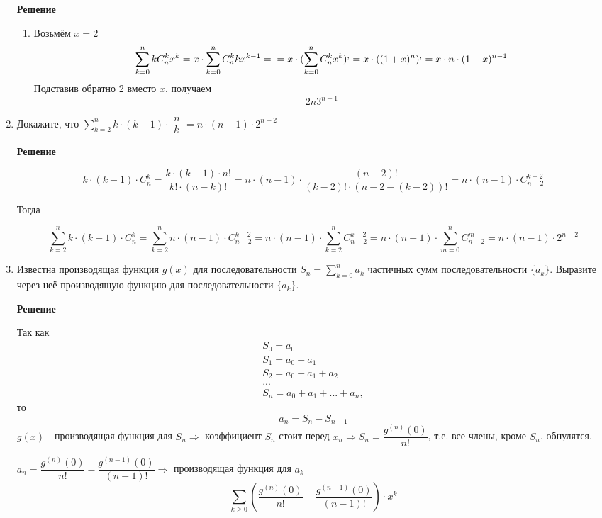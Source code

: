 \documentclass[12pt]{article}
\begin{document}
\begin{enumerate}[label={\textbf{\arabic{section}.\arabic*}}]
		\textbf{Решение}
		
		\begin{enumerate}[label=\textbf{\alph*)}]
			\item Возьмём $x = 2$
			$$
			\sum\limits_{k = 0}^n k C_n^k x^k = x \cdot \sum\limits_{k = 0}^n C_n^k k x^{k-1} = \\
			= x \cdot (\sum\limits_{k = 0}^n C_n^k x^k)^, = x \cdot ((1+x)^n)^, = x \cdot n \cdot (1+x)^{n-1}
			$$
			Подставив обратно 2 вместо $x$, получаем
			$$
			2n3^{n-1}
			$$
		\end{enumerate}
	
		\item Докажите, что $\sum\limits_{k = 2}^n k \cdot (k-1) \cdot \begin{matrix}
			n \\
			k
		\end{matrix} = n \cdot (n - 1) \cdot 2^{n - 2}$
		
		\textbf{Решение}
		
		$$
		k \cdot (k-1) \cdot C_n^k = \frac{k \cdot (k - 1) \cdot n!}{k! \cdot (n - k)!} = n \cdot (n - 1) \cdot \frac{(n - 2)!}{(k - 2)! \cdot (n - 2 - (k - 2))!} = n \cdot (n - 1) \cdot C_{n-2}^{k - 2}
		$$
		
		Тогда
		
		$$
		\sum\limits_{k=2}^n k \cdot (k-1) \cdot C_n^k = \sum\limits_{k=2}^n n \cdot (n - 1) \cdot C_{n-2}^{k - 2} = n \cdot (n - 1) \cdot \sum\limits_{k=2}^n C_{n-2}^{k - 2} = n \cdot (n - 1) \cdot \sum\limits_{m=0}^n C_{n-2}^{m} = n \cdot (n - 1) \cdot 2^{n - 2}
		$$
		
		\item Известна производящая функция $g(x)$ для последовательности $S_n =\sum\limits_{k=0}^n a_k$ частичных сумм последовательности $\{a_k\}$. Выразите через неё производящую функцию для последовательности $\{a_k\}$.
		
		\textbf{Решение}
		
		Так как
		$$
		\begin{gathered}
			S_0 = a_0 \\
			S_1 = a_0 + a_1 \\
			S_2 = a_0 + a_1 + a_2 \\
			... \\
			S_n = a_0 + a_1 + ... + a_n,
		\end{gathered}
		$$
		то
		$$
		a_n = S_n - S_{n-1}
		$$
		$g(x)$ - производящая функция для $S_n \Rightarrow$ коэффициент $S_n$ стоит перед $x_n \Rightarrow S_n = \dfrac{g^{(n)}(0)}{n!}$, т.е. все члены, кроме $S_n$, обнулятся.
		
		$a_n = \dfrac{g^{(n)}(0)}{n!} - \dfrac{g^{(n-1)}(0)}{(n-1)!} \Rightarrow$ производящая функция для $a_k$
		$$
		\sum\limits_{k \geqslant 0} \left(\frac{g^{(n)}(0)}{n!} - \frac{g^{(n-1)}(0)}{(n-1)!}\right) \cdot x^k
		$$
	\end{enumerate}
	\newpage
	
\end{document}
